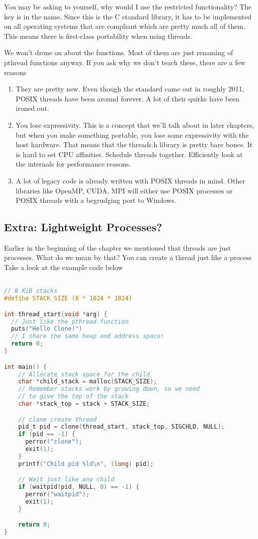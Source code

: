 You may be asking to yourself, why would I use the restricted functionality?
The key is in the name.
Since this is the C standard library, it has to be implemented on all operating systems that are compliant which are pretty much all of them.
This means there is first-class portability when using threads.

We won't drone on about the functions.
Most of them are just renaming of pthread functions anyway.
If you ask why we don't teach these, there are a few reasons

\begin{enumerate}
\item They are pretty new. Even though the standard came out in roughly 2011, POSIX threads have been around forever.
  A lot of their quirks have been ironed out.
\item You lose expressivity.
  This is a concept that we'll talk about in later chapters, but when you make something portable, you lose some expressivity with the host hardware.
  That means that the threads.h library is pretty bare bones.
  It is hard to set CPU affinities.
  Schedule threads together.
  Efficiently look at the internals for performance reasons.
\item A lot of legacy code is already written with POSIX threads in mind.
  Other libraries like OpenMP, CUDA, MPI will either use POSIX processes or POSIX threads with a begrudging port to Windows.
\end{enumerate}

\subsection{Extra: Lightweight Processes?}

Earlier in the beginning of the chapter we mentioned that threads are just processes.
What do we mean by that?
You can create a thread just like a process
Take a look at the example code below

\begin{lstlisting}[language=C]

// 8 KiB stacks
#define STACK_SIZE (8 * 1024 * 1024)

int thread_start(void *arg) {
  // Just like the pthread function
  puts("Hello Clone!")
  // I share the same heap and address space!
  return 0;
}

int main() {
    // Allocate stack space for the child
    char *child_stack = malloc(STACK_SIZE);
    // Remember stacks work by growing down, so we need
    // to give the top of the stack
    char *stack_top = stack + STACK_SIZE;

    // clone create thread
    pid_t pid = clone(thread_start, stack_top, SIGCHLD, NULL);
    if (pid == -1) {
      perror("clone");
      exit(1);
    }
    printf("Child pid %ld\n", (long) pid);

    // Wait just like any child
    if (waitpid(pid, NULL, 0) == -1) {
      perror("waitpid");
      exit(1);
    }

    return 0;
}
\end{lstlisting}

